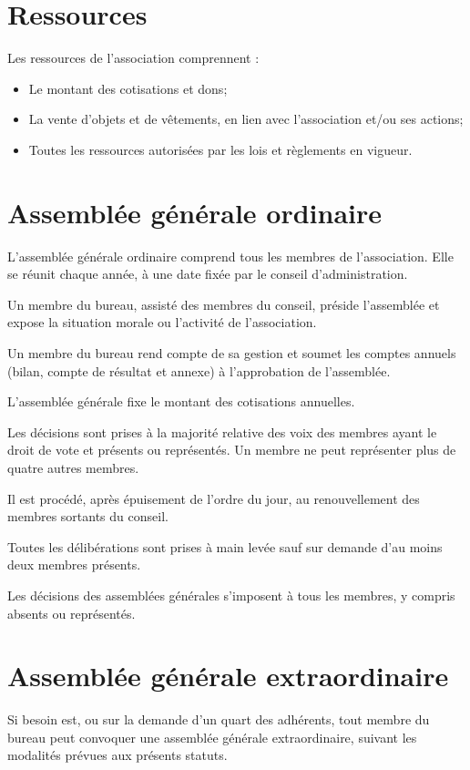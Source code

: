 \documentclass[11 pt]{article}
\begin{document}
\section{Ressources}

Les ressources de l’association comprennent :

\begin{itemize}
\item Le montant des cotisations et dons;
\item La vente d’objets et de vêtements, en lien avec l’association
  et/ou ses actions;
\item Toutes les ressources autorisées par les lois et règlements en
  vigueur.
\end{itemize}


\section{Assemblée générale ordinaire}

L’assemblée générale ordinaire comprend tous les membres de
l’association. Elle se réunit chaque année, à une date fixée par le
conseil d’administration.

Un membre du bureau, assisté des
membres du conseil, préside l’assemblée et expose la situation morale
ou l’activité de l’association.

Un membre du bureau rend compte de
sa gestion et soumet les comptes annuels (bilan, compte de résultat et
annexe) à l’approbation de l’assemblée.

L’assemblée générale fixe le montant des cotisations annuelles.

Les décisions sont prises à la majorité relative des voix des membres
ayant le droit de vote et présents ou représentés. Un membre ne peut
représenter plus de quatre autres membres.

Il est procédé, après épuisement de l’ordre du jour, au renouvellement
des membres sortants du conseil.

Toutes les délibérations sont prises à main levée sauf sur demande
d’au moins deux membres présents.

Les décisions des assemblées générales s’imposent à tous les membres,
y compris absents ou représentés.


\section{Assemblée générale extraordinaire}

Si besoin est, ou sur la demande d’un quart des adhérents, tout membre
du bureau peut convoquer une assemblée générale extraordinaire,
suivant les modalités prévues aux présents statuts.
\end{document}
